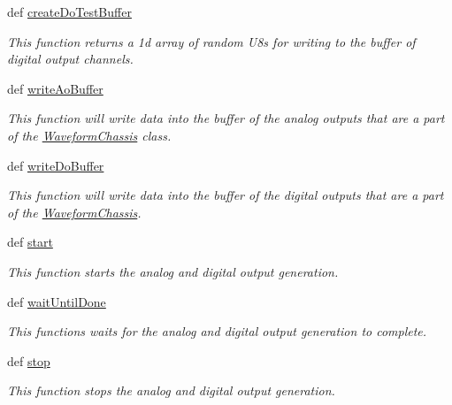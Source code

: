 \begin{DoxyCompactItemize}
def \hyperlink{class_waveform_chassis_1_1_waveform_chassis_a8c1f18f988b85405c9897d502c57454c}{create\-Do\-Test\-Buffer}
\begin{DoxyCompactList}\small\item\em This function returns a 1d array of random U8s for writing to the buffer of digital output channels. \end{DoxyCompactList}\item 
def \hyperlink{class_waveform_chassis_1_1_waveform_chassis_a42bdd67d68a729ad072aaf83de646dd8}{write\-Ao\-Buffer}
\begin{DoxyCompactList}\small\item\em This function will write data into the buffer of the analog outputs that are a part of the \hyperlink{class_waveform_chassis_1_1_waveform_chassis}{Waveform\-Chassis} class. \end{DoxyCompactList}\item 
def \hyperlink{class_waveform_chassis_1_1_waveform_chassis_a08080ba281bb601f6db05ce47863b81b}{write\-Do\-Buffer}
\begin{DoxyCompactList}\small\item\em This function will write data into the buffer of the digital outputs that are a part of the \hyperlink{class_waveform_chassis_1_1_waveform_chassis}{Waveform\-Chassis}. \end{DoxyCompactList}\item 
def \hyperlink{class_waveform_chassis_1_1_waveform_chassis_a324ff64c0087456811dfea0abeb1a3b6}{start}
\begin{DoxyCompactList}\small\item\em This function starts the analog and digital output generation. \end{DoxyCompactList}\item 
def \hyperlink{class_waveform_chassis_1_1_waveform_chassis_a3b82fba6c96c90d70efc9b3eb031f869}{wait\-Until\-Done}
\begin{DoxyCompactList}\small\item\em This functions waits for the analog and digital output generation to complete. \end{DoxyCompactList}\item 
def \hyperlink{class_waveform_chassis_1_1_waveform_chassis_a96f52784b946d309f98866433d0b2b67}{stop}
\begin{DoxyCompactList}\small\item\em This function stops the analog and digital output generation. \end{DoxyCompactList}\item 

\end{DoxyCompactItemize}
